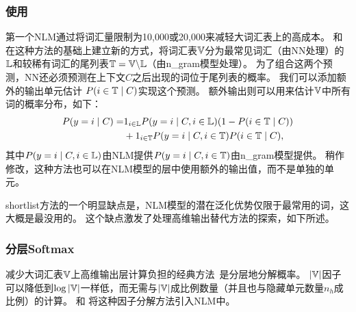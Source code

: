 \subsubsection{使用}
第一个\gls{NLM}\citep{BenDucVin01-small,Bengio-nnlm2003-small}通过将词汇量限制为10,000或20,000来减轻大词汇表上的高成本。
\citet{Schwenk+Gauvain2002}和 \citet{Schwenk-2007}在这种方法的基础上建立新的方式，将词汇表$\mathbb{V}$分为最常见词汇（由\gls{NN}处理）的~$\mathbb{L}$和较稀有词汇的尾列表$\mathbb{T} = \mathbb{V} \backslash \mathbb{L}$（由\gls{n_gram}模型处理）。
为了组合这两个预测，\gls{NN}还必须预测在上下文$C$之后出现的词位于尾列表的概率。
我们可以添加额外的输出单元估计 $P(i \in \mathbb{T} \mid C)$实现这个预测。
额外输出则可以用来估计$\mathbb{V}$中所有词的概率分布，如下：
\begin{align}
 P(y=i\mid C)  =& 1_{i \in \mathbb{L}} P(y=i\mid C, i \in \mathbb{L}) (1 - P(i \in \mathbb{T}\mid C)) \nonumber \\
     & + 1_{i \in \mathbb{T}} P(y=i\mid C, i \in \mathbb{T}) P(i \in \mathbb{T}\mid C),
\end{align}
其中$P(y=i\mid C, i \in \mathbb{L})$由\gls{NLM}提供$P(y=i\mid C, i \in \mathbb{T})$由\gls{n_gram}模型提供。
稍作修改，这种方法也可以在\gls{NLM}模型的层中使用额外的输出值，而不是单独的单元。

\gls{shortlist}方法的一个明显缺点是，\gls{NLM}模型的潜在泛化优势仅限于最常用的词，这大概是最没用的。
这个缺点激发了处理高维输出替代方法的探索，如下所述。

\subsubsection{分层Softmax}
减少大词汇表$\mathbb{V}$上高维输出层计算负担的经典方法~\citep{Goodman2001}是分层地分解概率。
$|\mathbb{V}|$因子可以降低到$\log |\mathbb{V}|$一样低，而无需与$|\mathbb{V}|$成比例数量（并且也与隐藏单元数量$n_h$成比例）的计算。
\citet{BengioTR1215}和\citet{Morin+Bengio-2005-small} 将这种因子分解方法引入\gls{NLM}中。


